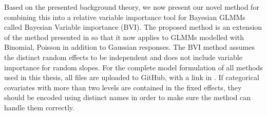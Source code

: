 Based on the presented background theory, we now present our novel method for combining this into a relative variable importance tool for Bayesian GLMMs called Bayesian Variable importance (BVI). The proposed method is an extension of the method presented in \citet{Arnstad:Relative_variable_importance_in_Bayesian_linear_mixed_models:2024} so that it now applies to GLMMs modelled with Binomial, Poisson in addition to Gaussian responses. The BVI method assumes the distinct random effects to be independent and does not include variable importance for random slopes.
\newline
\newline
For the complete model formulation of all methods used in this thesis, all files are uploaded to GitHub, with a link in . 
If categorical covariates with more than two levels are contained in the fixed effects, they should be encoded using distinct names in order to make sure the method can handle them correctly.
